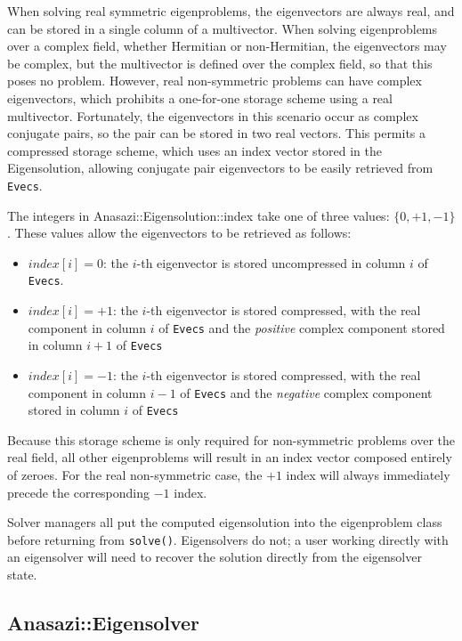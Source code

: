 When solving real symmetric eigenproblems, the eigenvectors are always real, and can be
stored in a single column of a multivector. When solving eigenproblems over a complex
field, whether Hermitian or non-Hermitian, the eigenvectors may be complex, but the multivector
is defined over the complex field, so that this poses no problem. However, real
non-symmetric problems can have complex eigenvectors, which prohibits a one-for-one
storage scheme using a real multivector.  Fortunately, the eigenvectors in this scenario
occur as complex conjugate pairs, so the pair can be stored in two real vectors. This
permits a compressed storage scheme, which uses an index vector stored in the
Eigensolution, allowing conjugate pair eigenvectors to be easily retrieved from
\verb!Evecs!. 

The integers in Anasazi::Eigensolution::index take one of three values: $\{0, +1, -1\}$.
These values allow the eigenvectors to be retrieved as follows:
\begin{itemize}
  \item $index[i]=0$: the $i$-th eigenvector is stored uncompressed in column $i$ of
    \verb!Evecs!.
  \item $index[i]=+1$: the $i$-th eigenvector is stored compressed, with the real
    component in column $i$ of \verb!Evecs! and the \emph{positive} complex component
    stored in column $i+1$ of \verb!Evecs!
  \item $index[i]=-1$: the $i$-th eigenvector is stored compressed, with the real
    component in column $i-1$ of \verb!Evecs! and the \emph{negative} complex component
    stored in column $i$ of \verb!Evecs!
\end{itemize}
Because this storage scheme is only required for non-symmetric problems over the real
field, all other eigenproblems will result in an index vector composed entirely of zeroes.
For the real non-symmetric case, the $+1$ index will always immediately precede the
corresponding $-1$ index.

\begin{remark}
  Solver managers all put the computed eigensolution into the eigenproblem class before
  returning from \verb!solve()!. Eigensolvers do not; a user working directly with an
  eigensolver will need to recover the solution directly from the eigensolver state.
\end{remark}

\subsection{Anasazi::Eigensolver}
\label{sec:anasazi:eigensolver}

